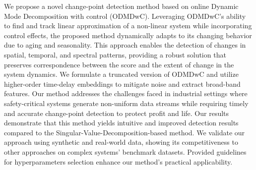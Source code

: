 We propose a novel change-point detection method based on online Dynamic Mode Decomposition with control (ODMDwC). Leveraging ODMDwC's ability to find and track linear approximation of a non-linear system while incorporating control effects, the proposed method dynamically adapts to its changing behavior due to aging and seasonality. This approach enables the detection of changes in spatial, temporal, and spectral patterns, providing a robust solution that preserves correspondence between the score and the extent of change in the system dynamics. We formulate a truncated version of ODMDwC and utilize higher-order time-delay embeddings to mitigate noise and extract broad-band features. Our method addresses the challenges faced in industrial settings where safety-critical systems generate non-uniform data streams while requiring timely and accurate change-point detection to protect profit and life. Our results demonstrate that this method yields intuitive and improved detection results compared to the Singular-Value-Decomposition-based method. We validate our approach using synthetic and real-world data, showing its competitiveness to other approaches on complex systems' benchmark datasets. Provided guidelines for hyperparameters selection enhance our method's practical applicability.
